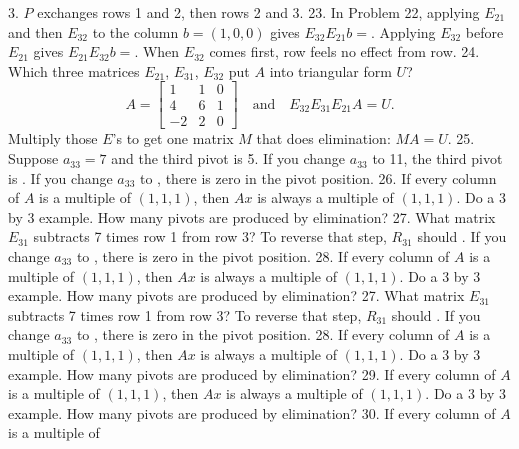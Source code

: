 3. \(P\) exchanges rows 1 and 2, then rows 2 and 3.
23. In Problem 22, applying \(E_{21}\) and then \(E_{32}\) to the column \(b=(1,0,0)\) gives \(E_{32}E_{21}b=\). Applying \(E_{32}\) before \(E_{21}\) gives \(E_{21}E_{32}b=\). When \(E_{32}\) comes first, row feels no effect from row.
24. Which three matrices \(E_{21}\), \(E_{31}\), \(E_{32}\) put \(A\) into triangular form \(U\)? \[A=\begin{bmatrix}1&1&0\\ 4&6&1\\ -2&2&0\end{bmatrix}\quad\text{and}\quad E_{32}E_{31}E_{21}A=U.\] Multiply those \(E\)'s to get one matrix \(M\) that does elimination: \(MA=U\).
25. Suppose \(a_{33}=7\) and the third pivot is 5. If you change \(a_{33}\) to 11, the third pivot is . If you change \(a_{33}\) to , there is zero in the pivot position.
26. If every column of \(A\) is a multiple of \((1,1,1)\), then \(Ax\) is always a multiple of \((1,1,1)\). Do a 3 by 3 example. How many pivots are produced by elimination?
27. What matrix \(E_{31}\) subtracts 7 times row 1 from row 3? To reverse that step, \(R_{31}\) should . If you change \(a_{33}\) to , there is zero in the pivot position.
28. If every column of \(A\) is a multiple of \((1,1,1)\), then \(Ax\) is always a multiple of \((1,1,1)\). Do a 3 by 3 example. How many pivots are produced by elimination?
27. What matrix \(E_{31}\) subtracts 7 times row 1 from row 3? To reverse that step, \(R_{31}\) should . If you change \(a_{33}\) to , there is zero in the pivot position.
28. If every column of \(A\) is a multiple of \((1,1,1)\), then \(Ax\) is always a multiple of \((1,1,1)\). Do a 3 by 3 example. How many pivots are produced by elimination?
29. If every column of \(A\) is a multiple of \((1,1,1)\), then \(Ax\) is always a multiple of \((1,1,1)\). Do a 3 by 3 example. How many pivots are produced by elimination?
30. If every column of \(A\) is a multiple of \ 